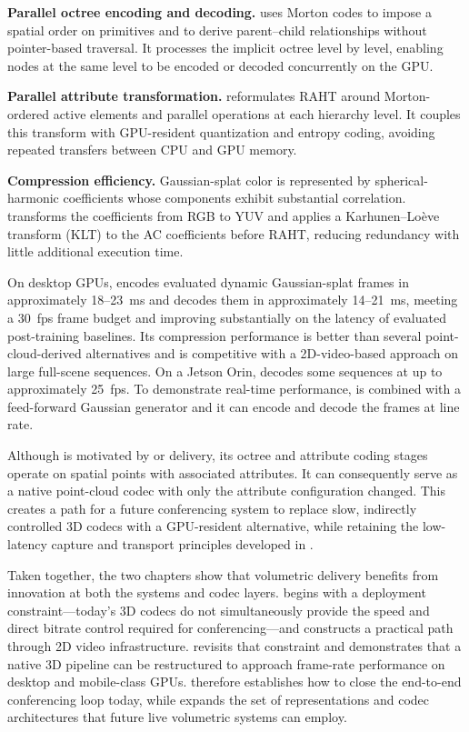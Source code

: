 \squishlist
    \item \textbf{Parallel octree encoding and decoding.} \gsnfs uses Morton codes to impose a spatial order on primitives and to derive parent--child relationships without pointer-based traversal. It processes the implicit octree level by level, enabling nodes at the same level to be encoded or decoded concurrently on the GPU.

    \item \textbf{Parallel attribute transformation.} \gsnfs reformulates RAHT around Morton-ordered active elements and parallel operations at each hierarchy level. It couples this transform with GPU-resident quantization and entropy coding, avoiding repeated transfers between CPU and GPU memory.

    \item \textbf{Compression efficiency.} Gaussian-splat color is represented by spherical-harmonic coefficients whose components exhibit substantial correlation. \gsnfs transforms the coefficients from RGB to YUV and applies a Karhunen--Lo\`eve transform (KLT) to the AC coefficients before RAHT, reducing redundancy with little additional execution time.
\squishend

On desktop GPUs, \gsnfs encodes evaluated dynamic Gaussian-splat frames in approximately 18--23~ms and decodes them in approximately 14--21~ms, meeting a 30~fps frame budget and improving substantially on the latency of evaluated post-training baselines. 
%
Its compression performance is better than several point-cloud-derived alternatives and is competitive with a 2D-video-based approach on large full-scene sequences. 
%
On a Jetson Orin, \gsnfs decodes some sequences at up to approximately 25~fps.
%
To demonstrate real-time performance, \gsnfs is combined with a feed-forward Gaussian generator and it can encode and decode the frames at line rate.

Although \gsnfs is motivated by \gs or \dgs delivery, its octree and attribute coding stages operate on spatial points with associated attributes. 
%
It can consequently serve as a native point-cloud codec with only the attribute configuration changed. 
%
This creates a path for a future conferencing system to replace slow, indirectly controlled 3D codecs with a GPU-resident alternative, while retaining the low-latency capture and transport principles developed in \livo.

Taken together, the two chapters show that volumetric delivery benefits from innovation at both the systems and codec layers. 
%
\livo begins with a deployment constraint---today's 3D codecs do not simultaneously provide the speed and direct bitrate control required for conferencing---and constructs a practical path through 2D video infrastructure. 
%
\gsnfs revisits that constraint and demonstrates that a native 3D pipeline can be restructured to approach frame-rate performance on desktop and mobile-class GPUs. 
%
\livo therefore establishes how to close the end-to-end conferencing loop today, while \gsnfs expands the set of representations and codec architectures that future live volumetric systems can employ.


